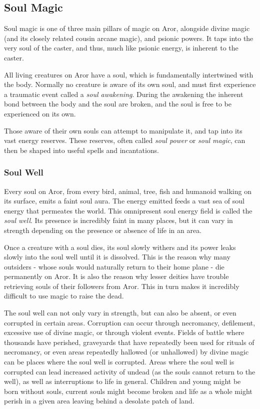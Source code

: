 \subsection{Soul Magic}
\label{sec:Soul Magic}

Soul magic is one of three main pillars of magic on Aror, alongside divine
magic (and its closely related cousin arcane magic), and psionic
powers. It taps into the very soul of the caster, and thus, much like psionic
energy, is inherent to the caster.

All living creatures on Aror have a soul, which is fundamentally intertwined
with the body. Normally no creature is aware of its own soul, and must first
experience a traumatic event called a \emph{soul awakening}. During the
awakening the inherent bond between the body and the soul are broken, and the
soul is free to be experienced on its own.

Those aware of their own souls can attempt to manipulate it, and tap into
its vast energy reserves. These reserves, often called \emph{soul power} or
\emph{soul magic}, can then be shaped into useful spells and incantations.

\subsubsection{Soul Well}
\label{sec:Soul Well}

Every soul on Aror, from every bird, animal, tree, fish and humanoid walking
on its surface, emits a faint soul aura. The energy emitted feeds a vast sea
of soul energy that permeates the world. This omnipresent soul energy field is
called the \emph{soul well}. Its presence is incredibly faint in many places,
but it can vary in strength depending on the presence or absence of life in an
area.

Once a creature with a soul dies, its soul slowly withers and its power leaks
slowly into the soul well until it is dissolved. This is the reason why
many outsiders - whose souls would naturally return to their home plane - die
permanently on Aror. It is also the reason why lesser deities have trouble
retrieving souls of their followers from Aror. This in turn makes it incredibly
difficult to use magic to raise the dead.

The soul well can not only vary in strength, but can also be absent, or
even corrupted in certain areas. Corruption can occur through necromancy,
defilement, excessive use of divine magic, or through violent events.
Fields of battle where thousands have perished, graveyards that have
repeatedly been used for rituals of necromancy, or even areas repeatedly
hallowed (or unhallowed) by divine magic can be places where the soul well
is corrupted. Areas where the soul well is corrupted can lead increased
activity of undead (as the souls cannot return to the well), as well as
interruptions to life in general. Children and young might be born without
souls, current souls might become broken and life as a whole might perish
in a given area leaving behind a desolate patch of land.

